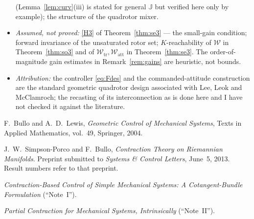 \documentclass[11pt,a4paper]{article}
\newcommand{\Jm}{\mathbb{J}}
\theoremstyle{plain}
\theoremstyle{definition}
\theoremstyle{remark}
\begin{document}
\begin{itemize}[leftmargin=1.6em,itemsep=3pt]
      (Lemma~\ref{lem:curv}(iii) is stated for general $\Jm$ but verified here only
      by example); the structure of the quadrotor mixer.
\item \emph{Assumed, not proved:} \ref{H3} of Theorem~\ref{thm:se3} --- the
      small-gain condition; forward invariance of the unsaturated rotor set;
      $K$-reachability of $\mathcal{W}$ in Theorem~\ref{thm:so3} and of
      $\mathcal{W}_{\mathrm{tr}},\mathcal{W}_{\mathrm{att}}$ in
      Theorem~\ref{thm:se3}. The order-of-magnitude gain estimates in
      Remark~\ref{rem:gains} are heuristic, not bounds.
\item \emph{Attribution:} the controller \eqref{eq:Fdes} and the commanded-attitude
      construction are the standard geometric quadrotor design associated with
      Lee, Leok and McClamroch; the recasting of its interconnection as
      \cite[Lem.~3.2]{SB13} is done here and I have not checked it against the
      literature.
\end{itemize}

\begin{thebibliography}{9}

F.~Bullo and A.~D.~Lewis,
\emph{Geometric Control of Mechanical Systems}, Texts in Applied Mathematics,
vol.~49, Springer, 2004.

J.~W.~Simpson-Porco and F.~Bullo,
\emph{Contraction Theory on Riemannian Manifolds}. Preprint submitted to
\emph{Systems \& Control Letters}, June~5, 2013. Result numbers refer to that
preprint.

\emph{Contraction-Based Control of Simple Mechanical Systems: A Cotangent-Bundle
Formulation} (``Note~I'').

\emph{Partial Contraction for Mechanical Systems, Intrinsically} (``Note~II'').

\end{thebibliography}
\end{document}
